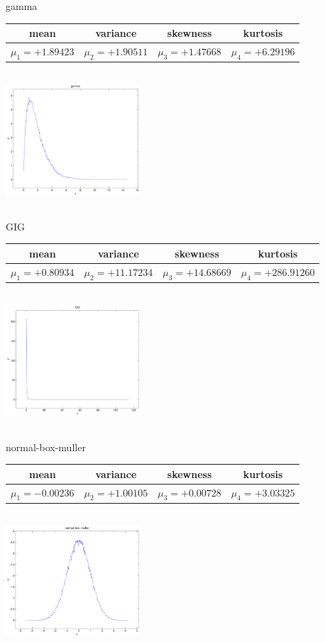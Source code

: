 \documentclass[9pt]{article}
\theoremstyle{plain}
\theoremstyle{definition}
\theoremstyle{remark}
\numberwithin{equation}{section}
\begin{document}
\newpage
gamma \begin{tabular}{|c|c|c|c|}  mean & variance & skewness & kurtosis \\  \hline
$\mu_1 = +1.89423$ & $\mu_2 = +1.90511$ & $\mu_3 = +1.47668$ & $\mu_4 =+6.29196$ \\
\end{tabular}

\includegraphics[width=5cm,height=5cm]{gamma.pdf}

GIG \begin{tabular}{|c|c|c|c|}  mean & variance & skewness & kurtosis \\  \hline
$\mu_1 = +0.80934$ & $\mu_2 = +11.17234$ & $\mu_3 = +14.68669$ & $\mu_4 =+286.91260$ \\
\end{tabular}

\includegraphics[width=5cm,height=5cm]{GIG.pdf}

normal-box-muller \begin{tabular}{|c|c|c|c|}  mean & variance & skewness & kurtosis \\  \hline
$\mu_1 = -0.00236$ & $\mu_2 = +1.00105$ & $\mu_3 = +0.00728$ & $\mu_4 =+3.03325$ \\
\end{tabular}

\includegraphics[width=5cm,height=5cm]{normal-box-muller.pdf}
\end{document}
